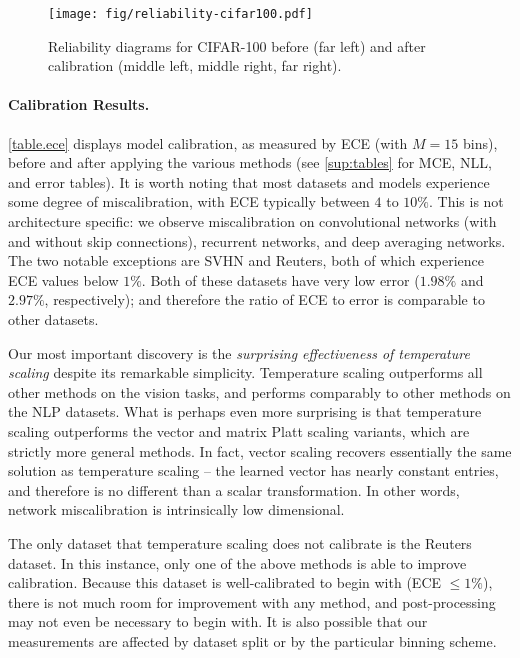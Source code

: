 \begin{figure*}[h!]
	\centering
	\texttt{[image: fig/reliability-cifar100.pdf]}
	\caption{Reliability diagrams for CIFAR-100 before (far left) and after calibration (middle left, middle right, far right).}
	\label{figure.reliability}
\end{figure*}

\paragraph{Calibration Results.}
\autoref{table.ece} displays model calibration, as measured by ECE (with $M=15$ bins), before and after applying the various methods (see \autoref{sup:tables} for MCE, NLL, and error tables).
It is worth noting that most datasets and models experience some degree of miscalibration, with ECE typically between $4$ to $10\%$.
This is not architecture specific: we observe miscalibration on convolutional networks (with and without skip connections), recurrent networks, and deep averaging networks.
The two notable exceptions are SVHN and Reuters, both of which experience ECE values below $1\%$. Both of these datasets have very low error ($1.98\%$ and $2.97\%$, respectively); and therefore the ratio of ECE to error is comparable to other datasets.

Our most important discovery is the \emph{surprising effectiveness of temperature scaling} despite its remarkable simplicity. Temperature scaling outperforms all other methods on the vision tasks, and performs comparably to other methods on the NLP datasets. What is perhaps even more surprising is that temperature scaling outperforms the vector and matrix Platt scaling variants, which are strictly more general methods. In fact, vector scaling recovers essentially the same solution as temperature scaling -- the learned vector has nearly constant entries, and therefore is no different than a scalar transformation. In other words, network miscalibration is intrinsically low dimensional.

The only dataset that temperature scaling does not calibrate is the Reuters dataset. In this instance, only one of the above methods is able to improve calibration. Because this dataset is well-calibrated to begin with (ECE $\leq 1\%$), there is not much room for improvement with any method, and post-processing may not even be necessary to begin with. It is also possible that our measurements are affected by dataset split or by the particular binning scheme.

